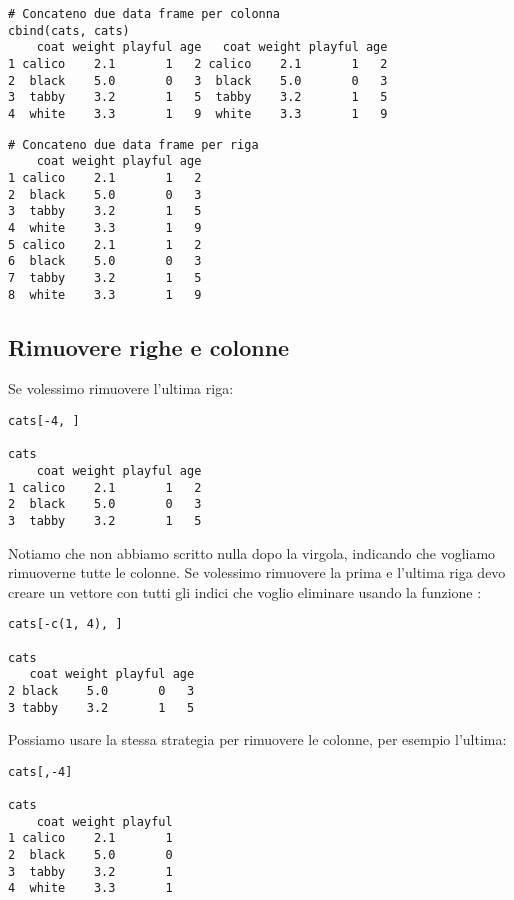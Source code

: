 \begin{lstlisting}[style=Rstyle]
# Concateno due data frame per colonna		
cbind(cats, cats)
    coat weight playful age   coat weight playful age
1 calico    2.1       1   2 calico    2.1       1   2
2  black    5.0       0   3  black    5.0       0   3
3  tabby    3.2       1   5  tabby    3.2       1   5
4  white    3.3       1   9  white    3.3       1   9
\end{lstlisting}

\begin{lstlisting}[style=Rstyle]
# Concateno due data frame per riga	
    coat weight playful age
1 calico    2.1       1   2
2  black    5.0       0   3
3  tabby    3.2       1   5
4  white    3.3       1   9
5 calico    2.1       1   2
6  black    5.0       0   3
7  tabby    3.2       1   5
8  white    3.3       1   9
\end{lstlisting}


\subsection{Rimuovere righe e colonne}
\label{sec:removefromdf}

Se volessimo rimuovere l'ultima riga:

\begin{lstlisting}[style=Rstyle]
cats[-4, ]

cats
    coat weight playful age
1 calico    2.1       1   2
2  black    5.0       0   3
3  tabby    3.2       1   5
\end{lstlisting}
%
Notiamo che non abbiamo scritto nulla dopo la virgola, indicando che vogliamo rimuoverne tutte le colonne. Se volessimo rimuovere la prima e l'ultima riga devo creare un vettore con tutti gli indici che voglio eliminare usando la funzione :

\begin{lstlisting}[style=Rstyle]
cats[-c(1, 4), ]

cats
   coat weight playful age
2 black    5.0       0   3
3 tabby    3.2       1   5
\end{lstlisting}

\noindent Possiamo usare la stessa strategia per rimuovere le colonne, per esempio l'ultima:

\begin{lstlisting}[style=Rstyle]
cats[,-4]

cats
    coat weight playful
1 calico    2.1       1
2  black    5.0       0
3  tabby    3.2       1
4  white    3.3       1
\end{lstlisting}


